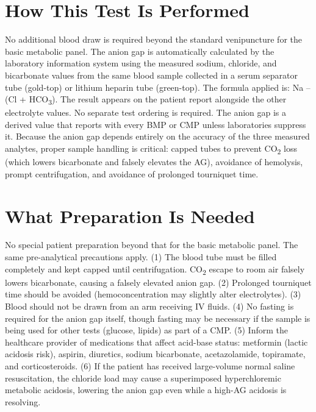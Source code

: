\section*{How This Test Is Performed}
No additional blood draw is required beyond the standard venipuncture for the basic metabolic panel. The anion gap is automatically calculated by the laboratory information system using the measured sodium, chloride, and bicarbonate values from the same blood sample collected in a serum separator tube (gold-top) or lithium heparin tube (green-top). The formula applied is: Na -- (Cl + HCO\textsubscript{3}). The result appears on the patient report alongside the other electrolyte values. No separate test ordering is required. The anion gap is a derived value that reports with every BMP or CMP unless laboratories suppress it. Because the anion gap depends entirely on the accuracy of the three measured analytes, proper sample handling is critical: capped tubes to prevent CO\textsubscript{2} loss (which lowers bicarbonate and falsely elevates the AG), avoidance of hemolysis, prompt centrifugation, and avoidance of prolonged tourniquet time.

\section*{What Preparation Is Needed}
No special patient preparation beyond that for the basic metabolic panel. The same pre-analytical precautions apply. (1) The blood tube must be filled completely and kept capped until centrifugation. CO\textsubscript{2} escape to room air falsely lowers bicarbonate, causing a falsely elevated anion gap. (2) Prolonged tourniquet time should be avoided (hemoconcentration may slightly alter electrolytes). (3) Blood should not be drawn from an arm receiving IV fluids. (4) No fasting is required for the anion gap itself, though fasting may be necessary if the sample is being used for other tests (glucose, lipids) as part of a CMP. (5) Inform the healthcare provider of medications that affect acid-base status: metformin (lactic acidosis risk), aspirin, diuretics, sodium bicarbonate, acetazolamide, topiramate, and corticosteroids. (6) If the patient has received large-volume normal saline resuscitation, the chloride load may cause a superimposed hyperchloremic metabolic acidosis, lowering the anion gap even while a high-AG acidosis is resolving.

